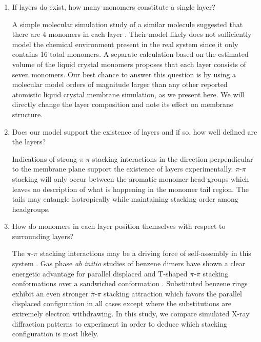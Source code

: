 \documentclass[journal=jpcbfk,manusciprt=article]{achemso}
\begin{document}
  \begin{enumerate}

  \item If layers do exist, how many monomers constitute a single layer? \label{point:monomernum}
  
  A simple molecular simulation study of a similar molecule suggested that
  there are 4 monomers in each layer \cite{zhu_methacrylated_2006}. Their model
  likely does not sufficiently model the chemical environment present in the real
  system since it only contains 16 total monomers. A separate calculation based
  on the estimated volume of the liquid crystal monomers proposes that each layer
  consists of seven monomers\cite{resel_structural_2000}. Our best chance to
  answer this question is by using a molecular model orders of magnitude larger
  than any other reported atomistic liquid crystal membrane simulation, as we
  present here. We will directly change the layer composition and note its effect
  on membrane structure.

  \item Does our model support the existence of layers and if so, how well
  defined are the layers? \label{point:layers} 

  Indications of strong $\pi$-$\pi$ stacking interactions in the direction
  perpendicular to the membrane plane support the existence of layers
  experimentally. $\pi$-$\pi$ stacking will only occur between the aromatic
  monomer head groups which leaves no description of what is happening in the
  monomer tail region. The tails may entangle isotropically while maintaining
  stacking order among headgroups. 

  \item How do monomers in each layer position themselves with respect to
  surrounding layers? \label{point:orientation}

  The $\pi$-$\pi$ stacking interactions may be a driving force of self-assembly
  in this system \cite{gazit_possible_2002}. Gas phase \textit{ab initio} studies
  of benzene dimers have shown a clear energetic advantage for parallel displaced
  and T-shaped $\pi$-$\pi$ stacking conformations over a sandwiched conformation
  \cite{sinnokrot_estimates_2002}. Substituted benzene rings exhibit an even
  stronger $\pi$-$\pi$ stacking attraction which favors the parallel displaced
  configuration in all cases except where the substitutions are extremely
  electron withdrawing\cite{waller_hybrid_2006,ringer_effect_2006}. In this
  study, we compare simulated X-ray diffraction patterns to experiment in order
  to deduce which stacking configuration is most likely. 


\end{enumerate}
\end{document}
